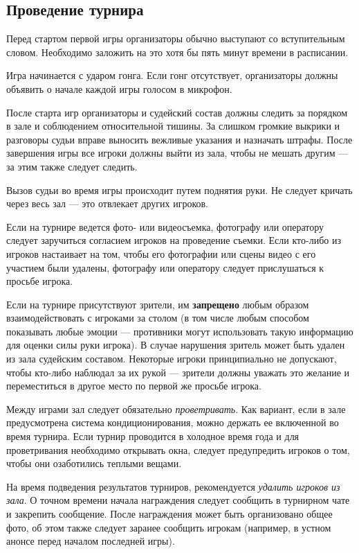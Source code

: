 \subsection{Проведение турнира}

Перед стартом первой игры организаторы обычно выступают со вступительным словом. Необходимо заложить на это хотя бы пять минут времени в расписании.

Игра начинается с ударом гонга. Если гонг отсутствует, организаторы должны объявить о начале каждой игры голосом в микрофон.

После старта игр организаторы и судейский состав должны следить за порядком в зале и соблюдением относительной тишины. За слишком громкие выкрики и разговоры судьи вправе выносить вежливые указания и назначать штрафы. После завершения игры все игроки должны выйти из зала, чтобы не мешать другим --- за этим также следует следить.

Вызов судьи во время игры происходит путем поднятия руки. Не следует кричать через весь зал --- это отвлекает других игроков.

Если на турнире ведется фото- или видеосъемка, фотографу или оператору следует заручиться согласием игроков на проведение съемки. Если кто-либо из игроков настаивает на том, чтобы его фотографии или сцены видео с его участием были удалены, фотографу или оператору следует прислушаться к просьбе игрока.

Если на турнире присутствуют зрители, им \textbf{запрещено} любым образом взаимодействовать с игроками за столом (в том числе любым способом показывать любые эмоции --- противники могут использовать такую информацию для оценки силы руки игрока). В случае нарушения зритель может быть удален из зала судейским составом. Некоторые игроки принципиально не допускают, чтобы кто-либо наблюдал за их рукой --- зрители должны уважать это желание и переместиться в другое место по первой же просьбе игрока.

Между играми зал следует обязательно \textit{проветривать}. Как вариант, если в зале предусмотрена система кондиционирования, можно держать ее включенной во время турнира. Если турнир проводится в холодное время года и для проветривания необходимо открывать окна, следует предупредить игроков о том, чтобы они озаботились теплыми вещами.

На время подведения результатов турниров, рекомендуется \textit{удалить игроков из зала}. О точном времени начала награждения следует сообщить в турнирном чате и закрепить сообщение. После награждения может быть организовано общее фото, об этом также следует заранее сообщить игрокам (например, в устном анонсе перед началом последней игры).

